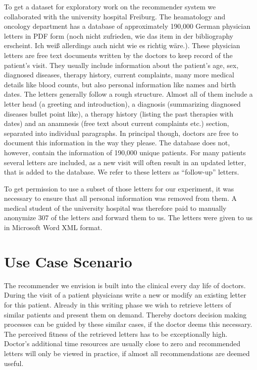 To get a dataset for exploratory work on the recommender system we collaborated with the university hospital Freiburg. The heamatology and oncology department has a database of approximately 190,000 German
physician letters in PDF form \citep{spadaro2012} (noch nicht zufrieden, wie das item in der bibliography erscheint. Ich weiß allerdings auch nicht wie es richtig wäre.). These physician letters are free text documents
written by the doctors to keep record of the patient's visit. They
usually include information about the patient's age, sex, diagnosed
diseases, therapy history, current complaints, many more medical details
like blood counts, but also personal information like names and birth dates.
The letters generally follow a rough structure. Almost all of them include a letter head (a greeting and introduction), a diagnosis (summarizing diagnosed diseases bullet point like), a therapy history (listing the past therapies with dates) and an anamnesis (free text about current complaints etc.) section, separated into individual paragraphs. In principal though, doctors are free to document this information in the way they please. The database does not, however, contain the information of 190,000 unique patients. For many patients several letters are included, as a new visit will often result in an updated letter, that is added to the database. We refer to these letters as ``follow-up'' letters.

To get permission to use a subset of those letters for our experiment, it was necessary to ensure that all personal information was removed from them. A medical student of the university hospital was therefore paid to manually anonymize 307 of the letters and forward them to us. The letters were given to us in Microsoft Word XML format.

\section{Use Case Scenario}
The recommender we envision is built into the clinical every day life of doctors. During the visit of a patient physicians write a new or modify an existing letter for this patient. Already in this writing phase we wish to retrieve letters of similar patients and present them on demand. Thereby doctors decision making processes can be guided by these similar cases, if the doctor deems this necessary. The perceived fitness of the retrieved letters has to be exceptionally high. Doctor's additional time resources are usually close to zero and recommended letters will only be viewed in practice, if almost all recommendations are deemed useful.

